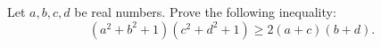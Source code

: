 Let $a,b,c,d$ be real numbers. Prove the following inequality:
$$(a^2+b^2+1)(c^2+d^2+1) \geq 2(a+c)(b+d).$$